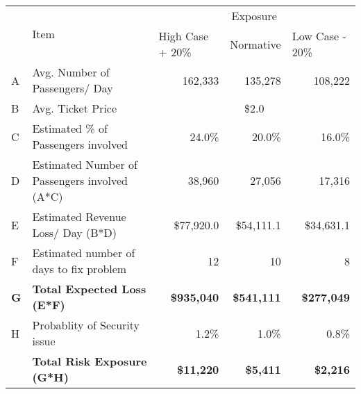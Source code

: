 \begin{table}[h]
\begin{tabularx}{\textwidth}{@{}lXrrr@{}}
\toprule
\multirow{2}{*}{} & \multirow{2}{*}{Item}                         & \multicolumn{3}{c}{Exposure}                                                                               \\ \cmidrule(l){3-5} 
                  &                                               & \multicolumn{1}{l}{High Case + 20\%} & \multicolumn{1}{l}{Normative} & \multicolumn{1}{l}{Low Case - 20\%} \\ \midrule
A                 & Avg. Number of Passengers/ Day                & 162,333                              & 135,278                       & 108,222                             \\
B                 & Avg. Ticket Price                             & \multicolumn{3}{c}{\$2.0}                                                                                  \\
C                 & Estimated \% of Passengers involved           & 24.0\%                               & 20.0\%                        & 16.0\%                              \\
D                 & Estimated Number of Passengers involved (A*C) & 38,960                               & 27,056                        & 17,316                              \\
E                 & Estimated Revenue Loss/ Day (B*D)             & \$77,920.0                           & \$54,111.1                    & \$34,631.1                          \\
F                 & Estimated number of days to fix problem       & 12                                   & 10                            & 8                                   \\
\textbf{G}        & \textbf{Total Expected Loss (E*F)}            & \textbf{\$935,040}                   & \textbf{\$541,111}            & \textbf{\$277,049}                  \\
H                 & Probablity of Security issue                  & 1.2\%                                & 1.0\%                         & 0.8\%                               \\
\textbf{}         & \textbf{Total Risk Exposure (G*H)}            & \textbf{\$11,220}                    & \textbf{\$5,411}              & \textbf{\$2,216}                 
\\ \bottomrule  
\end{tabularx}

\end{table}